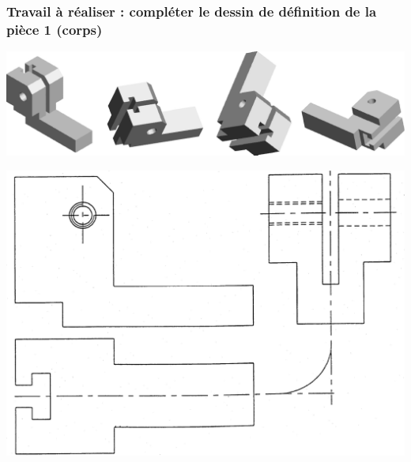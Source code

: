 \documentclass[11pt,oneside]{article}
\begin{document}
\subsubsection{Travail à réaliser : compléter le dessin de définition de la pièce 1
(corps)}

\begin{center}
\includegraphics[width=.9\textwidth]{png/fig11}
\end{center}

\begin{center}
\includegraphics[width=.9\textwidth]{png/fig12}
\end{center}
\end{document}
